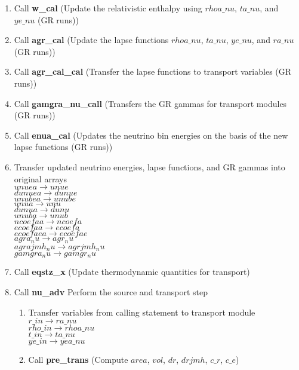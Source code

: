 \documentclass[11pt,doublespace]{article}
\begin{document}
\begin{itemize}
\begin{enumerate}
\begin{enumerate}
\begin{enumerate}
  \item Call {\bf w\_cal} (Update the relativistic enthalpy using $rhoa\_nu$, $ta\_nu$, and $ye\_nu$  (GR runs))
  \item Call {\bf agr\_cal} (Update the lapse functions $rhoa\_nu$, $ta\_nu$, $ye\_nu$, and $ra\_nu$ (GR runs))
  \item Call {\bf agr\_cal\_cal} (Transfer the lapse functions to transport variables (GR runs))
  \item Call {\bf gamgra\_nu\_call} (Transfers the GR gammas for transport modules (GR runs))
  \item Call {\bf enua\_cal} (Updates the neutrino bin energies on the basis of the new lapse functions (GR runs))
  \item Transfer updated neutrino energies, lapse functions, and GR gammas into original arrays\\
           $unuea \rightarrow unue$\\
           $dunuea \rightarrow dunue$\\
           $unubea \rightarrow unube$\\
           $unua \rightarrow unu$\\
           $dunua \rightarrow dunu$\\
           $unuba \rightarrow unub$\\
           $ncoefaa \rightarrow ncoefa$\\
           $ecoefaa \rightarrow ecoefa$\\
           $ecoefaea \rightarrow ecoefae$\\
           $agra_nu \rightarrow agr_nu$\\
           $agrajmh_nu \rightarrow agrjmh_nu$\\
           $gamgra_nu \rightarrow gamgr_nu$
  \item Call {\bf eqstz_x} (Update thermodynamic quantities for transport)
  \item Call {\bf nu\_adv} Perform the source and transport step
\begin{enumerate}
  \item Transfer variables from calling statement to transport module\\
           $r\_in \rightarrow ra\_nu$\\
           $rho\_in \rightarrow rhoa\_nu$\\
            $t\_in \rightarrow ta\_nu$\\
            $ye\_in \rightarrow yea\_nu$\\
  \item Call {\bf pre\_trans} (Compute $area$, $vol$, $dr$,  $drjmh$, $c\_r$, $c\_e$)

\end{enumerate}
\end{enumerate}
\end{enumerate}
\end{enumerate}
\end{itemize}
\end{document}
